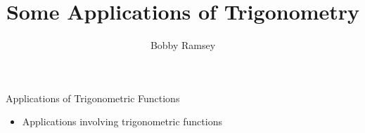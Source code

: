 \documentclass{ximera}
\author{Bobby Ramsey}
\title{Some Applications of Trigonometry}
\begin{document}
\begin{abstract}
\end{abstract}
\maketitle


\begin{objectives}
	
	\item Applications of Trigonometric Functions
		\begin{itemize}
			\item Applications involving trigonometric functions
		\end{itemize}
\end{objectives}
\end{document}
